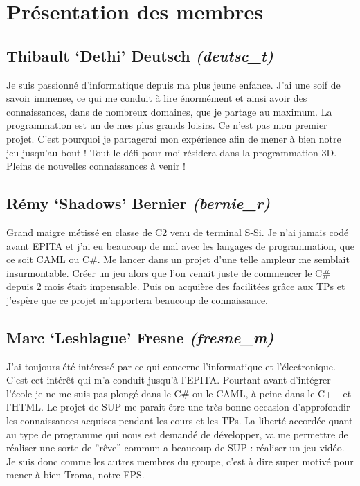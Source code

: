 \documentclass[a4paper, 11pt]{report}
\begin{document}
\newpage \section{Présentation des membres}\label{pruxe9sentation-des-membres}

\subsection{Thibault `Dethi' Deutsch \emph{(deutsc\_t)}}\label{thibault-dethi-deutsch-deutscux5ft}

Je suis passionné d'informatique depuis ma plus jeune enfance. J'ai une soif de savoir immense, ce qui me conduit à lire énormément et ainsi avoir des connaissances, dans de nombreux domaines, que je partage au maximum. La programmation est un de mes plus grands loisirs. Ce n'est pas mon premier projet. C'est pourquoi je partagerai mon expérience afin de mener à bien notre jeu jusqu'au bout ! Tout le défi pour moi résidera dans la programmation 3D. Pleins de nouvelles connaissances à venir !

\subsection{Rémy `Shadows' Bernier \emph{(bernie\_r)}}\label{ruxe9my-shadows-bernier-bernieux5fr}

Grand maigre métissé en classe de C2 venu de terminal S-Si. Je n'ai jamais codé avant EPITA et j'ai eu beaucoup de mal avec les langages de programmation, que ce soit CAML ou C\#. Me lancer dans un projet d'une telle ampleur me semblait insurmontable. Créer un jeu alors que l'on venait juste de commencer le C\# depuis 2 mois était impensable. Puis on acquière des facilitées grâce aux TPs et j'espère que ce projet m'apportera beaucoup de connaissance.

\subsection{Marc `Leshlague' Fresne \emph{(fresne\_m)}}\label{marc-leshlague-fresne-fresneux5fm}

J'ai toujours été intéressé par ce qui concerne l'informatique et l'électronique. C'est cet intérêt qui m'a conduit jusqu'à l'EPITA. Pourtant avant d'intégrer l'école je ne me suis pas plongé dans le C\# ou le CAML, à peine dans le C++ et l'HTML. Le projet de SUP me parait être une très bonne occasion d'approfondir les connaissances acquises pendant les cours et les TPs. La liberté accordée quant au type de programme qui nous est demandé de développer, va me permettre de réaliser une sorte de ''rêve'' commun a beaucoup de SUP : réaliser un jeu vidéo. Je suis donc comme les autres membres du groupe, c'est à dire super motivé pour mener à bien Troma, notre FPS.
\end{document}
